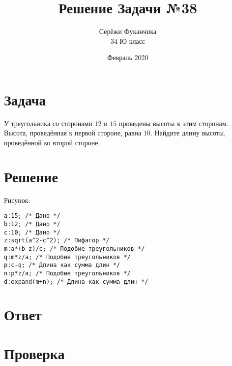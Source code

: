 \documentclass{article}
\title{Решение Задачи №38}
\author{Серёжи Фуканчика\\34 Ю класс}
\date{Февраль 2020}
\begin{document}
\maketitle

\section{Задача}

У треугольника со сторонами $12$ и $15$ проведены высоты к этим сторонам. Высота, проведённая к первой стороне, равна $10$. Найдите длину высоты, проведённой ко второй стороне.

\section{Решение}
Рисунок:
\begin{center}
\end{center}

\begin{verbatim}
a:15; /* Дано */
b:12; /* Дано */
c:10; /* Дано */
z:sqrt(a^2-c^2); /* Пифагор */
m:a*(b-z)/c; /* Подобие треугольников */
q:m*z/a; /* Подобие треугольников */
p:c-q; /* Длина как сумма длин */
n:p*z/a; /* Подобие треугольников */
d:expand(m+n); /* Длина как сумма длин */
\end{verbatim}

\section{Ответ}

\section{Проверка}
\end{document}
